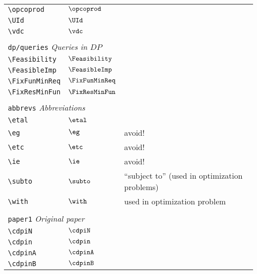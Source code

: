 \begin{longtable}{lll}
 {\color[rgb]{0.5,0.5,0.5}\texttt{\textbackslash opcoprod}} & $\opcoprod$ & \\ 
 {\color[rgb]{0.5,0.5,0.5}\texttt{\textbackslash UId}} & $\UId$ & \\ 
 {\color[rgb]{0.5,0.5,0.5}\texttt{\textbackslash vdc}} & $\vdc$ & \\ 
  &  & \\ 
 \multicolumn{3}{l}{{\color[rgb]{0.5,0.5,0.5}\texttt{dp/queries}} \emph{Queries in $DP$}}\\ 
 \hline
{\color[rgb]{0.5,0.5,0.5}\texttt{\textbackslash Feasibility}} & $\Feasibility$ & \\ 
 {\color[rgb]{0.5,0.5,0.5}\texttt{\textbackslash FeasibleImp}} & $\FeasibleImp$ & \\ 
 {\color[rgb]{0.5,0.5,0.5}\texttt{\textbackslash FixFunMinReq}} & $\FixFunMinReq$ & \\ 
 {\color[rgb]{0.5,0.5,0.5}\texttt{\textbackslash FixResMinFun}} & $\FixResMinFun$ & \\ 
  &  & \\ 
 \multicolumn{3}{l}{{\color[rgb]{0.5,0.5,0.5}\texttt{abbrevs}} \emph{Abbreviations}}\\ 
 \hline
\hline
{\color[rgb]{0.5,0.5,0.5}\texttt{\textbackslash etal}} & $\etal$ & \\ 
 {\color[rgb]{0.5,0.5,0.5}\texttt{\textbackslash eg}} & $\eg$ &  avoid!\\ 
 {\color[rgb]{0.5,0.5,0.5}\texttt{\textbackslash etc}} & $\etc$ &  avoid!\\ 
 {\color[rgb]{0.5,0.5,0.5}\texttt{\textbackslash ie}} & $\ie$ &  avoid!\\ 
 {\color[rgb]{0.5,0.5,0.5}\texttt{\textbackslash subto}} & $\subto$ &  ``subject to'' (used in optimization problems)\\ 
 {\color[rgb]{0.5,0.5,0.5}\texttt{\textbackslash with}} & $\with$ &  used in optimization problem\\ 
  &  & \\ 
 \multicolumn{3}{l}{{\color[rgb]{0.5,0.5,0.5}\texttt{paper1}} \emph{Original paper}}\\ 
 \hline
\hline
{\color[rgb]{0.5,0.5,0.5}\texttt{\textbackslash cdpiN}} & $\cdpiN$ & \\ 
 {\color[rgb]{0.5,0.5,0.5}\texttt{\textbackslash cdpin}} & $\cdpin$ & \\ 
 {\color[rgb]{0.5,0.5,0.5}\texttt{\textbackslash cdpinA}} & $\cdpinA$ & \\ 
 {\color[rgb]{0.5,0.5,0.5}\texttt{\textbackslash cdpinB}} & $\cdpinB$ & \\ 

\end{longtable}
